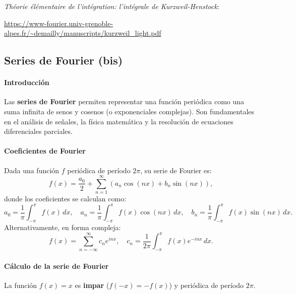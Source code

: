 \documentclass[12pt, a4paper]{article}
\theoremstyle{rioplatense}
\begin{document}
\textit{Théorie élémentaire de l'intégration: l'intégrale de Kurzweil-Henstock}: 

{\footnotesize \url{https://www-fourier.univ-grenoble-alpes.fr/~demailly/manuscripts/kurzweil_light.pdf}} %


\subsection{Series de Fourier (bis)} %


\paragraph{Introducción}
Las \textbf{series de Fourier} permiten representar una función periódica como una suma infinita de senos y cosenos (o exponenciales complejas). Son fundamentales en el análisis de señales, la física matemática y la resolución de ecuaciones diferenciales parciales.

\paragraph{Coeficientes de Fourier}
Dada una función \( f \) periódica de período \( 2\pi \), su serie de Fourier es:
\[
f(x) = \frac{a_0}{2} + \sum_{n=1}^\infty \left( a_n \cos(nx) + b_n \sin(nx) \right),
\]
donde los coeficientes se calculan como:
\[
a_0 = \frac{1}{\pi} \int_{-\pi}^\pi f(x) \, dx, \quad
a_n = \frac{1}{\pi} \int_{-\pi}^\pi f(x) \cos(nx) \, dx, \quad
b_n = \frac{1}{\pi} \int_{-\pi}^\pi f(x) \sin(nx) \, dx.
\]
Alternativamente, en forma compleja:
\[
f(x) = \sum_{n=-\infty}^\infty c_n e^{inx}, \quad
c_n = \frac{1}{2\pi} \int_{-\pi}^\pi f(x) e^{-inx} \, dx.
\]

\paragraph{Cálculo de la serie de Fourier} %

La función \( f(x) = x \) es \textbf{impar} (\( f(-x) = -f(x) \)) y periódica de período \( 2\pi \).
\end{document}
